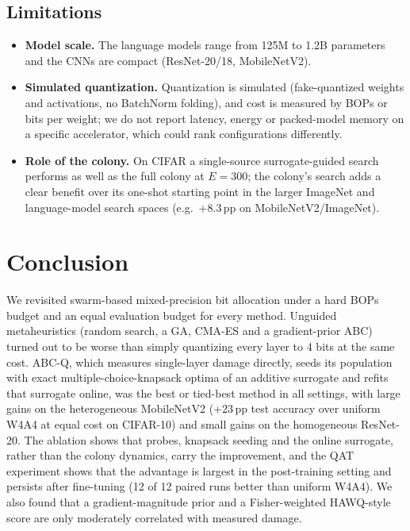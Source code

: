 \documentclass[11pt,a4paper]{article}
\begin{document}
\subsection{Limitations}
\begin{itemize}
\item \textbf{Model scale.} The language models range from 125M to 1.2B parameters and the CNNs are compact
      (ResNet-20/18, MobileNetV2).
\item \textbf{Simulated quantization.} Quantization is simulated (fake-quantized weights and activations,
      no BatchNorm folding), and cost is measured by BOPs or bits per weight; we do not report latency,
      energy or packed-model memory on a specific accelerator, which could rank configurations differently.
\item \textbf{Role of the colony.} On CIFAR a single-source surrogate-guided search performs as well as
      the full colony at $E=300$; the colony's search adds a clear benefit over its one-shot starting
      point in the larger ImageNet and language-model search spaces (e.g.\ $+8.3$\,pp on MobileNetV2/ImageNet).
\end{itemize}

\section{Conclusion}
We revisited swarm-based mixed-precision bit allocation under a hard BOPs budget and an equal
evaluation budget for every method. Unguided metaheuristics (random search, a GA, CMA-ES and a gradient-prior
ABC) turned out to be worse than simply quantizing every layer to 4 bits at the same
cost. ABC-Q, which measures single-layer damage directly, seeds its population with exact
multiple-choice-knapsack optima of an additive surrogate and refits that surrogate online, was the
best or tied-best method in all settings, with large gains on the heterogeneous MobileNetV2
($+23$\,pp test accuracy over uniform W4A4 at equal cost on CIFAR-10) and small gains on the homogeneous
ResNet-20. The ablation shows that probes, knapsack seeding and the online surrogate, rather than the
colony dynamics, carry the improvement, and the QAT experiment shows that the advantage is largest in
the post-training setting and persists after fine-tuning (12 of 12 paired runs better than uniform
W4A4). We also found that a gradient-magnitude prior and a
Fisher-weighted HAWQ-style score are only moderately correlated with measured damage.
\end{document}
